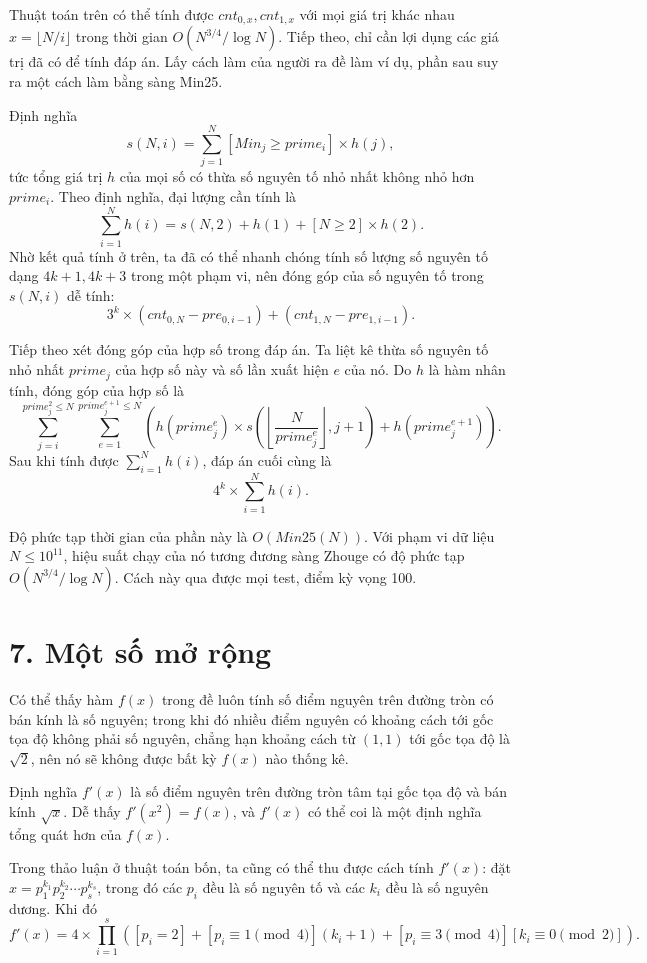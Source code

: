 \documentclass[11pt]{article}
\begin{document}
Thuật toán trên có thể tính được \(cnt_{0,x},cnt_{1,x}\) với mọi giá trị khác
nhau \(x=\lfloor N/i\rfloor\) trong thời gian \(O(N^{3/4}/\log N)\). Tiếp
theo, chỉ cần lợi dụng các giá trị đã có để tính đáp án. Lấy cách làm của
người ra đề làm ví dụ, phần sau suy ra một cách làm bằng sàng Min25.

Định nghĩa
\[
  s(N,i)=\sum_{j=1}^{N}[Min_j\ge prime_i]\times h(j),
\]
tức tổng giá trị \(h\) của mọi số có thừa số nguyên tố nhỏ nhất không nhỏ hơn
\(prime_i\). Theo định nghĩa, đại lượng cần tính là
\[
  \sum_{i=1}^{N}h(i)=s(N,2)+h(1)+[N\ge2]\times h(2).
\]
Nhờ kết quả tính ở trên, ta đã có thể nhanh chóng tính số lượng số nguyên tố
dạng \(4k+1,4k+3\) trong một phạm vi, nên đóng góp của số nguyên tố trong
\(s(N,i)\) dễ tính:
\[
  3^k\times(cnt_{0,N}-pre_{0,i-1})+(cnt_{1,N}-pre_{1,i-1}).
\]

Tiếp theo xét đóng góp của hợp số trong đáp án. Ta liệt kê thừa số nguyên tố
nhỏ nhất \(prime_j\) của hợp số này và số lần xuất hiện \(e\) của nó. Do
\(h\) là hàm nhân tính, đóng góp của hợp số là
\[
  \sum_{j=i}^{prime_j^2\le N}
  \sum_{e=1}^{prime_j^{e+1}\le N}
  \left(h(prime_j^e)\times
  s\left(\left\lfloor\frac{N}{prime_j^e}\right\rfloor,j+1\right)
  +h(prime_j^{e+1})\right).
\]
Sau khi tính được \(\sum_{i=1}^{N} h(i)\), đáp án cuối cùng là
\[
  4^k\times\sum_{i=1}^{N} h(i).
\]

Độ phức tạp thời gian của phần này là \(O(Min25(N))\). Với phạm vi dữ liệu
\(N\le10^{11}\), hiệu suất chạy của nó tương đương sàng Zhouge có độ phức tạp
\(O(N^{3/4}/\log N)\). Cách này qua được mọi test, điểm kỳ vọng 100.

\section*{7. Một số mở rộng}

Có thể thấy hàm \(f(x)\) trong đề luôn tính số điểm nguyên trên đường tròn có
bán kính là số nguyên; trong khi đó nhiều điểm nguyên có khoảng cách tới gốc
tọa độ không phải số nguyên, chẳng hạn khoảng cách từ \((1,1)\) tới gốc tọa độ
là \(\sqrt2\), nên nó sẽ không được bất kỳ \(f(x)\) nào thống kê.

Định nghĩa \(f'(x)\) là số điểm nguyên trên đường tròn tâm tại gốc tọa độ và
bán kính \(\sqrt x\). Dễ thấy \(f'(x^2)=f(x)\), và \(f'(x)\) có thể coi là một
định nghĩa tổng quát hơn của \(f(x)\).

Trong thảo luận ở thuật toán bốn, ta cũng có thể thu được cách tính \(f'(x)\):
đặt \(x=p_1^{k_1}p_2^{k_2}\cdots p_s^{k_s}\), trong đó các \(p_i\) đều là số
nguyên tố và các \(k_i\) đều là số nguyên dương. Khi đó
\[
  f'(x)=4\times\prod_{i=1}^{s}
  \left([p_i=2]+[p_i\equiv1\pmod4](k_i+1)
  +[p_i\equiv3\pmod4][k_i\equiv0\pmod2]\right).
\]
\end{document}

